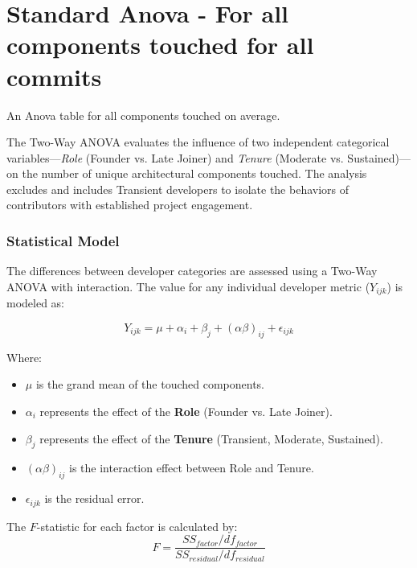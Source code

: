 \section{Standard Anova - For all components touched for all commits} 
\label{sec:codebase_graph_latex.repository_graph.component_time_series.standard_anovaall commits} 
An Anova table for all components touched on average. 

The Two-Way ANOVA evaluates the influence of two independent categorical variables—\textit{Role} (Founder vs. Late Joiner) and \textit{Tenure} (Moderate vs. Sustained)—on the number of unique architectural components touched. The analysis excludes and includes Transient developers to isolate the behaviors of contributors with established project engagement.




\subsubsection*{Statistical Model}
The differences between developer categories are assessed using a Two-Way ANOVA 
with interaction. The value for any individual developer metric ($Y_{ijk}$) 
is modeled as:

\begin{equation}
    Y_{ijk} = \mu + \alpha_i + \beta_j + (\alpha\beta)_{ij} + \epsilon_{ijk}
\end{equation}

Where:
\begin{itemize}
    \item $\mu$ is the grand mean of the touched components.
    \item $\alpha_i$ represents the effect of the \textbf{Role} (Founder vs. Late Joiner).
    \item $\beta_j$ represents the effect of the \textbf{Tenure} (Transient, Moderate, Sustained).
    \item $(\alpha\beta)_{ij}$ is the interaction effect between Role and Tenure.
    \item $\epsilon_{ijk}$ is the residual error.
\end{itemize}

The $F$-statistic for each factor is calculated by:
\begin{equation}
    F = \frac{SS_{factor} / df_{factor}}{SS_{residual} / df_{residual}}
\end{equation}

\newpage 
